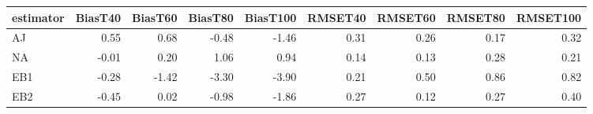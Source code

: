 \begin{table}[ht]
\centering
\begin{tabular}{lrrrrrrrr}
  \toprule
estimator & BiasT40 & BiasT60 & BiasT80 & BiasT100 & RMSET40 & RMSET60 & RMSET80 & RMSET100 \\ 
  \midrule
AJ & 0.55 & 0.68 & -0.48 & -1.46 & 0.31 & 0.26 & 0.17 & 0.32 \\ 
  NA & -0.01 & 0.20 & 1.06 & 0.94 & 0.14 & 0.13 & 0.28 & 0.21 \\ 
  EB1 & -0.28 & -1.42 & -3.30 & -3.90 & 0.21 & 0.50 & 0.86 & 0.82 \\ 
  EB2 & -0.45 & 0.02 & -0.98 & -1.86 & 0.27 & 0.12 & 0.27 & 0.40 \\ 
   \bottomrule
\end{tabular}
\end{table}
